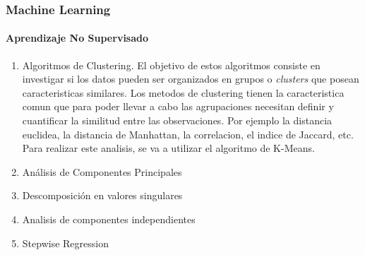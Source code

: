 \documentclass[spanish,12pt, a4paper,twoside]{paper}
\begin{document}
\subsubsection{Machine Learning}
\paragraph {Aprendizaje No Supervisado}
\begin{enumerate}
\item Algoritmos de Clustering. El objetivo de estos algoritmos consiste en investigar si los datos pueden ser organizados en grupos o \textit{clusters} que posean caracteristicas similares. %
Los metodos de clustering tienen la caracteristica comun que para poder llevar a cabo las agrupaciones necesitan definir y cuantificar la similitud entre las observaciones. Por ejemplo la distancia euclidea, la distancia de Manhattan, la correlacion, el indice de Jaccard, etc. %
Para realizar este analisis, se va a utilizar el algoritmo de K-Means. %
\item Análisis de Componentes Principales
\item Descomposición en valores singulares
\item Analisis de componentes independientes
\item Stepwise Regression
\end{enumerate}

\end{document}
